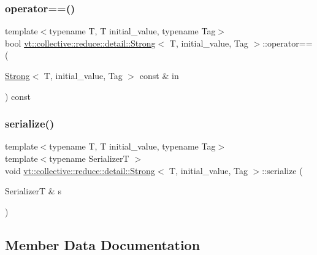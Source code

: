 \subsubsection{\texorpdfstring{operator==()}{operator==()}}
{\footnotesize\ttfamily template$<$typename T, T initial\+\_\+value, typename Tag$>$ \\
bool \hyperlink{structvt_1_1collective_1_1reduce_1_1detail_1_1_strong}{vt\+::collective\+::reduce\+::detail\+::\+Strong}$<$ T, initial\+\_\+value, Tag $>$\+::operator== (\begin{DoxyParamCaption}\item[{\hyperlink{structvt_1_1collective_1_1reduce_1_1detail_1_1_strong}{Strong}$<$ T, initial\+\_\+value, Tag $>$ const \&}]{in }\end{DoxyParamCaption}) const\hspace{0.3cm}{\ttfamily [inline]}}

\mbox{\label{structvt_1_1collective_1_1reduce_1_1detail_1_1_strong_a6abf31948f9dbd77f4caeb265fd68586}} 
\subsubsection{\texorpdfstring{serialize()}{serialize()}}
{\footnotesize\ttfamily template$<$typename T, T initial\+\_\+value, typename Tag$>$ \\
template$<$typename SerializerT $>$ \\
void \hyperlink{structvt_1_1collective_1_1reduce_1_1detail_1_1_strong}{vt\+::collective\+::reduce\+::detail\+::\+Strong}$<$ T, initial\+\_\+value, Tag $>$\+::serialize (\begin{DoxyParamCaption}\item[{SerializerT \&}]{s }\end{DoxyParamCaption})\hspace{0.3cm}{\ttfamily [inline]}}



\subsection{Member Data Documentation}
\mbox{\label{structvt_1_1collective_1_1reduce_1_1detail_1_1_strong_a1952e524a596e85011084327aacff707}} 

